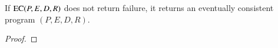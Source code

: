 \begin{theorem}
If $\textsc{EC}(P, E, D, R)$ does not return failure, it returns an eventually consistent program $(P, E, D, R)$.
\end{theorem}
\begin{proof}
\end{proof}


